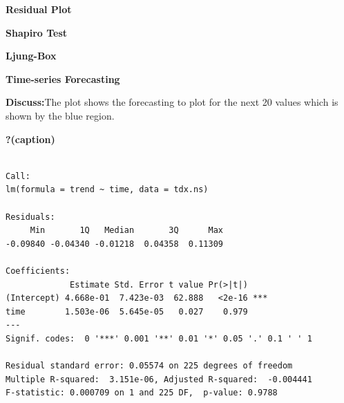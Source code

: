 \documentclass[12pt,a4paper]{book}
\begin{document}
{\textbf{Residual Plot}

\textbf{Shapiro Test}

\textbf{Ljung-Box}

\textbf{Time-series Forecasting}

\textbf{Discuss:}The plot shows the forecasting to plot for the next 20
values which is shown by the blue region.

\begin{Shaded}
\begin{Highlighting}[]
\OtherTok{\textless{}{-}} \NormalTok{(} \NormalTok{(}\SpecialCharTok{:}\SpecialCharTok{{-}}\SpecialCharTok{$}\NormalTok{time.series[,}\NormalTok{])}
\OtherTok{\textless{}{-}} \NormalTok{(}\NormalTok{(}\SpecialCharTok{\textasciitilde{}}
\end{Highlighting}
\end{Shaded}

\begin{table}

\caption{\textbf{?(caption)}}\begin{minipage}[t]{\linewidth}

{\centering 

\begin{verbatim}

Call:
lm(formula = trend ~ time, data = tdx.ns)

Residuals:
     Min       1Q   Median       3Q      Max 
-0.09840 -0.04340 -0.01218  0.04358  0.11309 

Coefficients:
             Estimate Std. Error t value Pr(>|t|)    
(Intercept) 4.668e-01  7.423e-03  62.888   <2e-16 ***
time        1.503e-06  5.645e-05   0.027    0.979    
---
Signif. codes:  0 '***' 0.001 '**' 0.01 '*' 0.05 '.' 0.1 ' ' 1

Residual standard error: 0.05574 on 225 degrees of freedom
Multiple R-squared:  3.151e-06, Adjusted R-squared:  -0.004441 
F-statistic: 0.000709 on 1 and 225 DF,  p-value: 0.9788
\end{verbatim}

}

\end{minipage}%


\end{table}}
\end{document}
